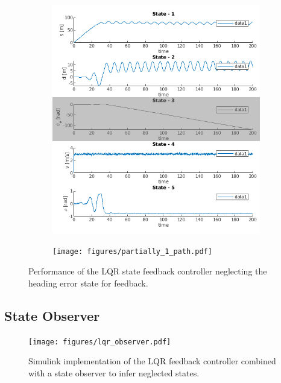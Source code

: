\begin{figure}[h]
	\centering
	\begin{subfigure}{0.49\textwidth}
	\includegraphics[width=\textwidth]{figures/partially_1_states.png}	
	\end{subfigure}
	\begin{subfigure}{0.49\textwidth}
	\texttt{[image: figures/partially\_1\_path.pdf]}
	\end{subfigure}
	\caption{Performance of the LQR state feedback controller neglecting the heading error state for feedback.}
	\label{fig:partially_states}
\end{figure}

\subsection{State Observer}

\begin{figure}[h]
	\centering
	\texttt{[image: figures/lqr\_observer.pdf]}
	\caption{Simulink implementation of the LQR feedback controller combined with a state observer to infer neglected states.}
	\label{fig:lqr_and_observer}
\end{figure}
